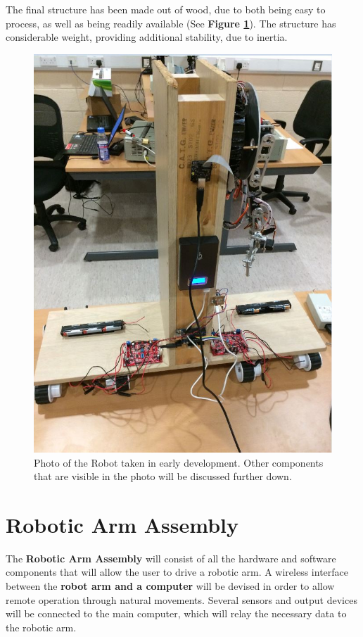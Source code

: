 \documentclass[12p,a4paper]{report}
\begin{document}
The final structure has been made out of wood, due to both being easy to process, as well as being readily available (See \textbf{Figure \ref{fig:robot_body2}}). The structure has considerable weight, providing additional stability, due to inertia.

\begin{figure}[H]
\begin{center}
\includegraphics[scale=0.50]{robot_body_low}
\caption{Photo of the Robot taken in early development. Other components that are visible in the photo will be discussed further down.}
\label{fig:robot_body2}
\end{center}
\end{figure}


\section{Robotic Arm Assembly}


The \textbf{Robotic Arm Assembly} will consist of all the hardware and software components that will allow the user to drive a robotic arm. A wireless interface between the \textbf{robot arm and a computer} will be devised in order to allow remote operation through natural movements. Several sensors and output devices will be connected to the main computer, which will relay the necessary data to the robotic arm.
\newpage
\end{document}
